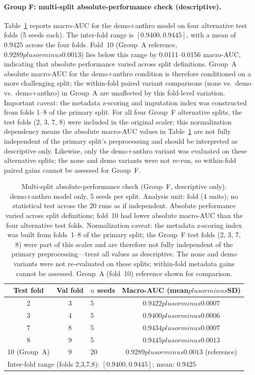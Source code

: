 \documentclass[mathematics,article,pdftex]{Definitions/mdpi}
\def\texttt#1{#1}%
\def\textbf#1{#1}%
\def\emph#1{#1}%
\def\pm{plus or minus }%
\begin{document}
\paragraph{Group F: multi-split absolute-performance check (descriptive).}
Table~\ref{tab:group_f} reports macro-AUC for the \texttt{demo+anthro} model on four alternative test folds (5 seeds each). The inter-fold range is $[0.9400, 0.9445]$, with a mean of $0.9425$ across the four folds. \textbf{Fold~10 (Group~A reference, $0.9289\pm0.0013$) lies below this range by 0.0111--0.0156 macro-AUC}, indicating that absolute performance varied across split definitions. Group~A absolute macro-AUC for the \texttt{demo+anthro} condition is therefore conditioned on a more challenging split; the within-fold paired variant comparisons (none vs.\ demo vs.\ demo+anthro) in Group~A are unaffected by this fold-level variation. \emph{Important caveat:} the metadata z-scoring and imputation index was constructed from folds 1--8 of the primary split. For all four Group~F alternative splits, the test folds (2, 3, 7, 8) were included in the original scaler; this normalization dependency means the absolute macro-AUC values in Table~\ref{tab:group_f} are not fully independent of the primary split's preprocessing and should be interpreted as descriptive only. Likewise, only the \texttt{demo+anthro} variant was evaluated on these alternative splits; the \texttt{none} and \texttt{demo} variants were not re-run, so within-fold paired gains cannot be assessed for Group~F.

\begin{table}[H]
\caption{Multi-split absolute-performance check (Group~F, descriptive only). \texttt{demo+anthro} model only, 5 seeds per split. Analysis unit: fold (4 units); no statistical test across the 20 runs as if independent. Absolute performance varied across split definitions; fold~10 had lower absolute macro-AUC than the four alternative test folds. \emph{Normalization caveat:} the metadata z-scoring index was built from folds~1--8 of the primary split; the Group~F test folds (2, 3, 7, 8) were part of this scaler and are therefore not fully independent of the primary preprocessing---treat all values as descriptive. The \texttt{none} and \texttt{demo} variants were not re-evaluated on these splits; within-fold metadata gains cannot be assessed. Group~A (fold~10) reference shown for comparison.}\label{tab:group_f}
\small\centering
\begin{tabular}{cclc}
\toprule
\textbf{Test fold} & \textbf{Val fold} & \textbf{$n$ seeds} & \textbf{Macro-AUC (mean$\pm$SD)} \\
\midrule
2 & 3 & 5 & $0.9422\pm0.0007$ \\
3 & 4 & 5 & $0.9400\pm0.0006$ \\
7 & 8 & 5 & $0.9434\pm0.0007$ \\
8 & 9 & 5 & $0.9445\pm0.0013$ \\
\midrule
10 (Group~A) & 9 & 20 & $0.9289\pm0.0013$ (reference) \\
\bottomrule
\multicolumn{4}{l}{\footnotesize Inter-fold range (folds 2,3,7,8): $[0.9400, 0.9445]$; mean: $0.9425$}\\
\end{tabular}
\end{table}
\end{document}
